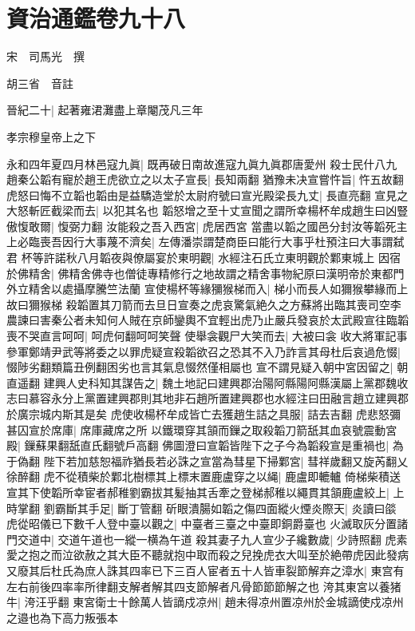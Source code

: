 \chapter{資治通鑑卷九十八}
宋　司馬光　撰

胡三省　音註

晉紀二十|{
	起著雍涒灘盡上章閹茂凡三年}


孝宗穆皇帝上之下

永和四年夏四月林邑寇九眞|{
	既再破日南故進寇九眞九眞郡唐愛州}
殺士民什八九　趙秦公韜有寵於趙王虎欲立之以太子宣長|{
	長知兩翻}
猶豫未决宣嘗忤旨|{
	忤五故翻}
虎怒曰悔不立韜也韜由是益驕造堂於太尉府號曰宣光殿梁長九丈|{
	長直亮翻}
宣見之大怒斬匠截梁而去|{
	以犯其名也}
韜怒增之至十丈宣聞之謂所幸楊杯牟成趙生曰凶豎傲愎敢爾|{
	愎弼力翻}
汝能殺之吾入西宮|{
	虎居西宮}
當盡以韜之國邑分封汝等韜死主上必臨喪吾因行大事蔑不濟矣|{
	左傳潘崇謂楚商臣曰能行大事乎杜預注曰大事謂弑君}
杯等許諾秋八月韜夜與僚屬宴於東明觀|{
	水經注石氏立東明觀於鄴東城上}
因宿於佛精舍|{
	佛精舍佛寺也僧徒專精修行之地故謂之精舍事物紀原曰漢明帝於東都門外立精舍以處攝摩騰竺法蘭}
宣使楊杯等緣獼猴梯而入|{
	梯小而長人如獮猴攀緣而上故曰獮猴梯}
殺韜置其刀箭而去旦日宣奏之虎哀驚氣絶久之方蘇將出臨其喪司空李農諫曰害秦公者未知何人賊在京師鑾輿不宜輕出虎乃止嚴兵發哀於太武殿宣往臨韜喪不哭直言呵呵|{
	呵虎何翻呵呵笑聲}
使舉衾觀尸大笑而去|{
	大被曰衾}
收大將軍記事參軍鄭靖尹武等將委之以罪虎疑宣殺韜欲召之恐其不入乃詐言其母杜后哀過危惙|{
	惙陟劣翻類篇丑例翻困劣也言其氣息惙然僅相屬也}
宣不謂見疑入朝中宮因留之|{
	朝直遥翻}
建興人史科知其謀告之|{
	魏土地記曰建興郡治陽阿縣陽阿縣漢屬上黨郡魏收志曰慕容永分上黨置建興郡則其地非石趙所置建興郡也水經注曰田融言趙立建興郡於廣宗城内斯其是矣}
虎使收楊杯牟成皆亡去獲趙生詰之具服|{
	詰去吉翻}
虎悲怒彌甚囚宣於席庫|{
	席庫藏席之所}
以鐵環穿其頷而鏁之取殺韜刀箭舐其血哀號震動宮殿|{
	鏁蘇果翻舐直氏翻號戶高翻}
佛圖澄曰宣韜皆陛下之子今為韜殺宣是重禍也|{
	為于偽翻}
陛下若加慈恕福祚猶長若必誅之宣當為彗星下掃鄴宮|{
	彗祥歲翻又旋芮翻乂徐醉翻}
虎不從積柴於鄴北樹標其上標末置鹿盧穿之以䋲|{
	鹿盧即轆轤}
倚梯柴積送宣其下使韜所幸宦者郝稚劉霸拔其髪抽其舌牽之登梯郝稚以繩貫其頷鹿盧絞上|{
	上時掌翻}
劉霸斷其手足|{
	斷丁管翻}
斫眼潰腸如韜之傷四面縱火煙炎際天|{
	炎讀曰燄}
虎從昭儀已下數千人登中臺以觀之|{
	中臺者三臺之中臺即銅爵臺也}
火滅取灰分置諸門交道中|{
	交道午道也一縱一横為午道}
殺其妻子九人宣少子纔數歲|{
	少詩照翻}
虎素愛之抱之而泣欲赦之其大臣不聽就抱中取而殺之兒挽虎衣大叫至於絶帶虎因此發病又廢其后杜氏為庶人誅其四率已下三百人宦者五十人皆車裂節解弃之漳水|{
	東宫有左右前後四率率所律翻支解者解其四支節解者凡骨節節節解之也}
洿其東宮以養猪牛|{
	洿汪乎翻}
東宮衛士十餘萬人皆謫戍凉州|{
	趙未得凉州置凉州於金城謫使戍凉州之邉也為下高力叛張本}
